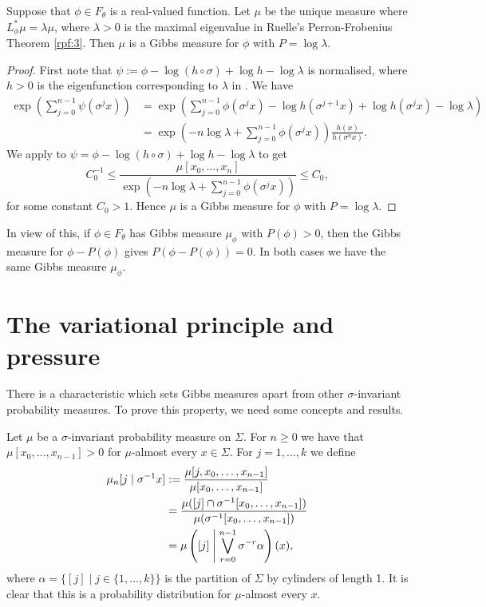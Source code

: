\begin{corollary}
	Suppose that $\phi \in F_\theta$ is a real-valued function. Let $\mu$ be the unique measure where $L_\phi^*\mu = \lambda\mu$, where $\lambda > 0$ is the maximal eigenvalue in Ruelle's Perron-Frobenius Theorem \ref{rpf:3}. Then $\mu$ is a Gibbs measure for $\phi$ with $P = \log{\lambda}$.
	\begin{proof}
		First note that $\psi := \phi - \log{(h \circ \sigma)} + \log{h} - \log{\lambda}$ is normalised, where $h > 0$ is the eigenfunction corresponding to $\lambda$ in . We have
		\begin{align*}
			\exp\left(\sum_{j = 0}^{n - 1}{\psi(\sigma^j{x})}\right) &= \exp\left(\sum_{j = 0}^{n - 1}{\phi(\sigma^j{x}) - \log{h(\sigma^{j + 1}{x})} + \log{h(\sigma^j{x})} - \log{\lambda}}\right) \\
				&= \exp\left(-n\log{\lambda} + \sum_{j = 0}^{n - 1}{\phi(\sigma^j{x})}\right) \frac{h(x)}{h(\sigma^n{x})}.
		\end{align*}
		We apply  to $\psi = \phi - \log{(h \circ \sigma)} + \log{h} - \log{\lambda}$ to get
		\[
			C_0^{-1} \leq \frac{\mu[x_0, \dots, x_n]}{\exp\left(-n\log{\lambda} + \sum_{j = 0}^{n - 1}{\phi(\sigma^j{x})}\right)} \leq C_0,
		\]
		for some constant $C_0 > 1$. Hence $\mu$ is a Gibbs measure for $\phi$ with $P = \log{\lambda}$.
	\end{proof}
\end{corollary}

In view of this, if $\phi \in F_\theta$ has Gibbs measure $\mu_\phi$ with $P(\phi) > 0$, then the Gibbs measure for $\phi - P(\phi)$ gives $P(\phi - P(\phi)) = 0$. In both cases we have the same Gibbs measure $\mu_\phi$.

\section{The variational principle and pressure}
There is a characteristic which sets Gibbs measures apart from other $\sigma$-invariant probability measures. To prove this property, we need some concepts and results.

Let $\mu$ be a $\sigma$-invariant probability measure on $\Sigma$. For $n \geq 0$ we have that $\mu[x_0, \dots, x_{n - 1}] > 0$ for $\mu$-almost every $x \in \Sigma$. For $j = 1, \dots, k$ we define
\begin{align*}
	\mu_n[j \mid \sigma^{-1}{x}] &:= \frac{\mu[j, x_0, \dots, x_{n - 1}]}{\mu[x_0, \dots, x_{n - 1}]} \\
		&= \frac{\mu([j] \cap \sigma^{-1}[x_0, \dots, x_{n - 1}])}{\mu(\sigma^{-1}[x_0, \dots, x_{n - 1}])} \\
		&= \mu\left([j] \mathrel{}\middle|\mathrel{} \bigvee_{r = 0}^{n - 1}{\sigma^{-r}{\alpha}}\right)(x),
\end{align*}
where $\alpha = \{[j] \mid j \in \{1, \dots, k\}\}$ is the partition of $\Sigma$ by cylinders of length 1. It is clear that this is a probability distribution for $\mu$-almost every $x$.

